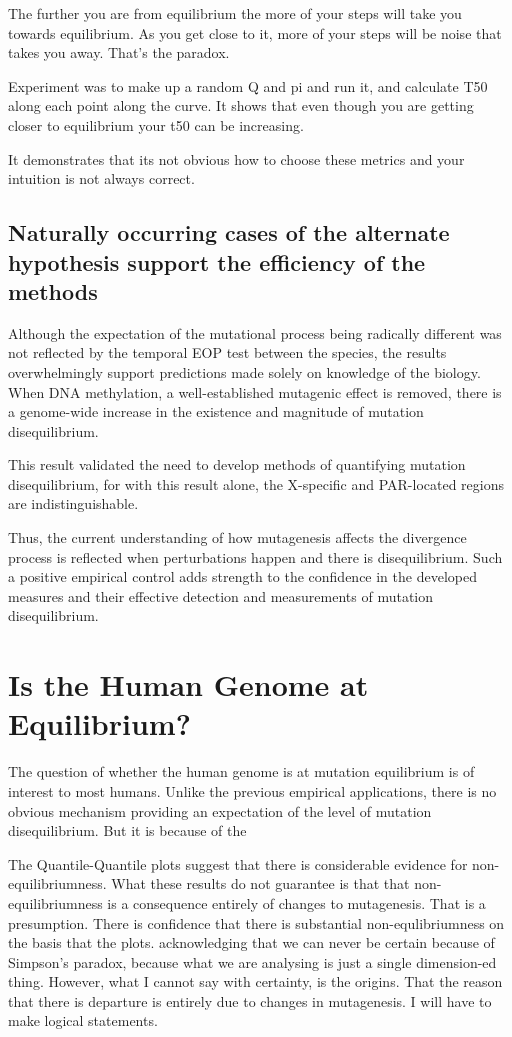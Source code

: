 The further you are from equilibrium the more of your steps will take you towards equilibrium.  As you get close to it, more of your steps will be noise that takes you away. That's the paradox. 

Experiment was to make up a random Q and pi and run it, and calculate T50 along each point along the curve. It shows that even though you are getting closer to equilibrium your t50 can be increasing. 

It demonstrates that its not obvious how to choose these metrics and your intuition is not always correct. 


\subsection*{Naturally occurring cases of the alternate hypothesis support the efficiency of the methods}


 Although the expectation of the mutational process being radically different was not reflected by the temporal EOP test between the species, the results overwhelmingly support predictions made solely on knowledge of the biology. When DNA methylation, a well-established mutagenic effect is removed, there is a genome-wide increase in the existence and magnitude of mutation disequilibrium. 

This result validated the need to develop methods of quantifying mutation disequilibrium, for with this result alone, the X-specific and PAR-located regions are indistinguishable.

Thus, the current understanding of how mutagenesis affects the divergence process is reflected when perturbations happen and there is disequilibrium. Such a positive empirical control adds strength to the confidence in the developed measures and their effective detection and measurements of mutation disequilibrium. 

\section{Is the Human Genome at Equilibrium?}

The question of whether the human genome is at mutation equilibrium is of interest to most humans. Unlike the previous empirical applications, there is no obvious mechanism providing an expectation of the level of mutation disequilibrium. But it is because of the 


The Quantile-Quantile plots suggest that there is considerable evidence for non-equilibriumness. What these results do not guarantee is that that non-equilibriumness is a consequence entirely of changes to mutagenesis. That is a presumption. There is confidence that there is substantial non-equlibriumness on the basis that the plots. acknowledging that we can never be certain because of Simpson's paradox, because what we are analysing is just a single dimension-ed thing. However, what I cannot say with certainty, is the origins. That the reason that there is departure is entirely due to changes in mutagenesis. I will have to make logical statements. 

